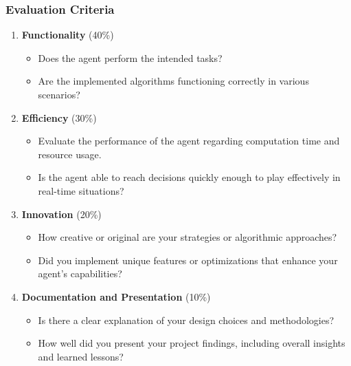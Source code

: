 \documentclass[aspectratio=169]{beamer}
\begin{document}
\begin{frame}[fragile]
    \frametitle{Evaluation Criteria}
    \begin{enumerate}
        \item \textbf{Functionality} (40\%)
            \begin{itemize}
                \item Does the agent perform the intended tasks?
                \item Are the implemented algorithms functioning correctly in various scenarios?
            \end{itemize}
        
        \item \textbf{Efficiency} (30\%)
            \begin{itemize}
                \item Evaluate the performance of the agent regarding computation time and resource usage.
                \item Is the agent able to reach decisions quickly enough to play effectively in real-time situations?
            \end{itemize}
        
        \item \textbf{Innovation} (20\%)
            \begin{itemize}
                \item How creative or original are your strategies or algorithmic approaches?
                \item Did you implement unique features or optimizations that enhance your agent's capabilities?
            \end{itemize}
        
        \item \textbf{Documentation and Presentation} (10\%)
            \begin{itemize}
                \item Is there a clear explanation of your design choices and methodologies?
                \item How well did you present your project findings, including overall insights and learned lessons?
            \end{itemize}
    \end{enumerate}
\end{frame}
\end{document}
